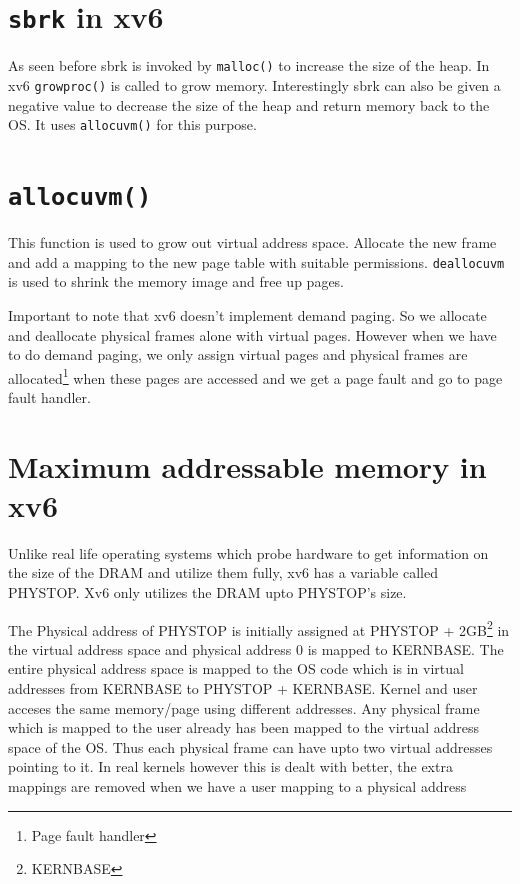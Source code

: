 \documentclass[12pt]{article}
\begin{document}
\section{\texttt{sbrk} in xv6}
As seen before sbrk is invoked by \texttt{malloc()} to increase the size of the heap. In xv6 \texttt{growproc()} is called to grow memory. Interestingly
sbrk can also be given a negative value to decrease the size of the heap and return memory back to the OS. It uses \texttt{allocuvm()} for this purpose.


\section{\texttt{allocuvm()}}
This function is used to grow out virtual address space. Allocate the new frame and add a mapping to the new page table with suitable permissions. 
\texttt{deallocuvm} is used to shrink the memory image and free up pages.

Important to note that xv6 doesn't implement demand paging. So we allocate and deallocate physical frames alone with virtual pages. However when we have to do demand paging, we only assign 
virtual pages and physical frames are allocated\footnote{Page fault handler} when these pages are accessed and we get a page fault and go to page fault handler.

\section{Maximum addressable memory in xv6}
Unlike real life operating systems which probe hardware to get information on the size of the DRAM and utilize them fully, xv6 has a variable called PHYSTOP. Xv6 only utilizes the DRAM upto PHYSTOP's size.

The Physical address of PHYSTOP is initially assigned at PHYSTOP + 2GB\footnote{KERNBASE} in the virtual address space and physical address 0 is mapped to KERNBASE. 
The entire physical address space is mapped to the OS code which is in virtual addresses from KERNBASE to PHYSTOP + KERNBASE. Kernel and user acceses the same memory/page using different addresses.
Any physical frame which is mapped to the user already has been mapped to the virtual address space of the OS. Thus each physical frame can have upto two virtual addresses pointing to it. In real kernels however this 
is dealt with better, the extra mappings are removed when we have a user mapping to a physical address
\end{document}
